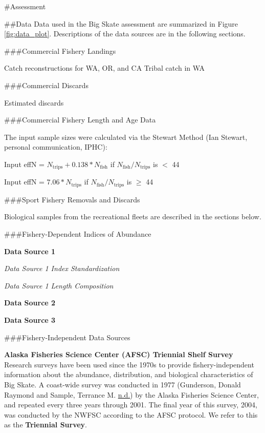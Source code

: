 \documentclass[12pt,]{article}
\begin{document}
\#Assessment

\#\#Data Data used in the Big Skate assessment are summarized in Figure
\ref{fig:data_plot}. Descriptions of the data sources are in the
following sections.

\#\#\#Commercial Fishery Landings

Catch reconstructions for WA, OR, and CA Tribal catch in WA

\#\#\#Commercial Discards

Estimated discards

\#\#\#Commercial Fishery Length and Age Data

The input sample sizes were calculated via the Stewart Method (Ian
Stewart, personal communication, IPHC):

\begin{centering}

Input effN = $N_{\text{trips}} + 0.138 * N_{\text{fish}}$ if $N_{\text{fish}}/N_{\text{trips}}$ is $<$ 44

Input effN = $7.06 * N_{\text{trips}}$ if $N_{\text{fish}}/N_{\text{trips}}$ is $\geq$ 44

\end{centering}

\#\#\#Sport Fishery Removals and Discards

Biological samples from the recreational fleets are described in the
sections below.

\#\#\#Fishery-Dependent Indices of Abundance

\textbf{Data Source 1}

\emph{Data Source 1 Index Standardization}

\emph{Data Source 1 Length Composition}

\textbf{Data Source 2}

\textbf{Data Source 3}

\#\#\#Fishery-Independent Data Sources

\textbf{Alaska Fisheries Science Center (AFSC) Triennial Shelf Survey}\\
Research surveys have been used since the 1970s to provide
fishery-independent information about the abundance, distribution, and
biological characteristics of Big Skate. A coast-wide survey was
conducted in 1977 (Gunderson, Donald Raymond and Sample, Terrance M.
\protect\hyperlink{ref-Gunderson1980}{n.d.}) by the Alaska Fisheries
Science Center, and repeated every three years through 2001. The final
year of this survey, 2004, was conducted by the NWFSC according to the
AFSC protocol. We refer to this as the \textbf{Triennial Survey}.
\end{document}
